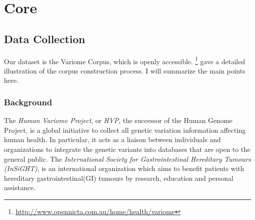 \chapter{Core}  %

\ifpdf
    \graphicspath{{Core/Figs/Raster/}{Core/Figs/PDF/}{Core/Figs/}}
\else
    \graphicspath{{Core/Figs/Vector/}{Core/Figs/}}
\fi

\section{Data Collection} %
Our dataset is the Variome Corpus\cite{verspoor2013annotating}, which is openly accessible. \footnote{\href{http://www.opennicta.com.au/home/health/variome}\url{http://www.opennicta.com.au/home/health/variome}} \citet{verspoor2013annotating} gave a detailed illustration of the corpus construction process. I will summarize the main points here.
\subsection{Background}
The \emph{Human Variome Project}, or \emph{HVP}, the successor of the Human Genome Project, is a global initiative to collect all genetic variation information affecting human health\cite{ring2006human}. In particular, it acts as a liaison between individuals and organizations to integrate the genetic variants into databases that are open to the general public\cite{verspoor2013annotating}.\newline\newline
The \emph{International Society for Gastrointestinal Hereditary Tumours (InSiGHT)}, is an international organization which aims to benefit patients with hereditary gastrointestinal(GI) tumours by research, education and personal assistance. 



